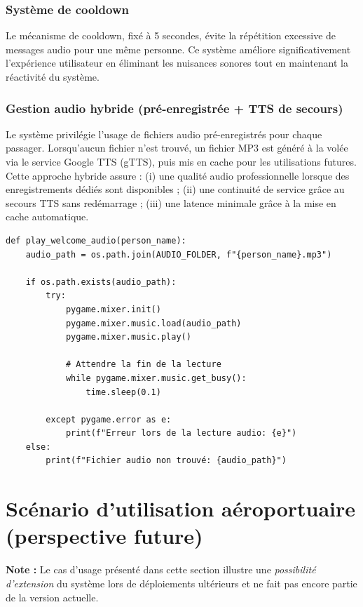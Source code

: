 \documentclass[12pt,a4paper]{article}
\begin{document}
\subsubsection{Système de cooldown}

Le mécanisme de cooldown, fixé à 5 secondes, évite la répétition excessive de messages audio pour une même personne. Ce système améliore significativement l'expérience utilisateur en éliminant les nuisances sonores tout en maintenant la réactivité du système.

\subsubsection{Gestion audio hybride (pré-enregistrée + TTS de secours)}

Le système privilégie l'usage de fichiers audio pré-enregistrés pour chaque passager. Lorsqu'aucun fichier n'est trouvé, un fichier MP3 est généré à la volée via le service Google TTS (gTTS), puis mis en cache pour les utilisations futures. Cette approche hybride assure : (i) une qualité audio professionnelle lorsque des enregistrements dédiés sont disponibles ; (ii) une continuité de service grâce au secours TTS sans redémarrage ; (iii) une latence minimale grâce à la mise en cache automatique.

\begin{lstlisting}[caption=Fonction de lecture audio]
def play_welcome_audio(person_name):
    audio_path = os.path.join(AUDIO_FOLDER, f"{person_name}.mp3")
    
    if os.path.exists(audio_path):
        try:
            pygame.mixer.init()
            pygame.mixer.music.load(audio_path)
            pygame.mixer.music.play()
            
            # Attendre la fin de la lecture
            while pygame.mixer.music.get_busy():
                time.sleep(0.1)
                
        except pygame.error as e:
            print(f"Erreur lors de la lecture audio: {e}")
    else:
        print(f"Fichier audio non trouvé: {audio_path}")
\end{lstlisting}

\newpage

\section{Scénario d'utilisation aéroportuaire (perspective future)}

\textbf{Note :} Le cas d'usage présenté dans cette section illustre une \emph{possibilité d'extension} du système lors de déploiements ultérieurs et ne fait pas encore partie de la version actuelle.
\end{document}
